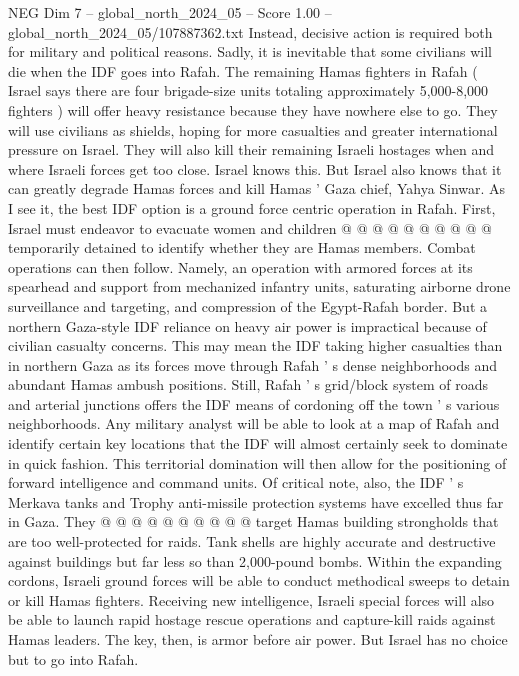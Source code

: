 \begin{textsample}{NEG Dim 7 – global\_north\_2024\_05 – Score 1.00 – global\_north\_2024\_05/107887362.txt}
Instead, decisive action is required both for military and political reasons.
Sadly, it is inevitable that some civilians will die when the IDF goes into Rafah.
The remaining Hamas fighters in Rafah ( Israel says there are four brigade-size units totaling approximately 5,000-8,000 fighters ) will offer heavy resistance because they have nowhere else to go.
They will use civilians as shields, hoping for more casualties and greater international pressure on Israel.
They will also kill their remaining Israeli hostages when and where Israeli forces get too close.
Israel knows this.
But Israel also knows that it can greatly degrade Hamas forces and kill Hamas ' Gaza chief, Yahya Sinwar.
As I see it, the best IDF option is a ground force centric operation in Rafah.
First, Israel must endeavor to evacuate women and children @ @ @ @ @ @ @ @ @ @ temporarily detained to identify whether they are Hamas members.
Combat operations can then follow.
Namely, an operation with armored forces at its spearhead and support from mechanized infantry units, saturating airborne drone surveillance and targeting, and compression of the Egypt-Rafah border.
But a northern Gaza-style IDF reliance on heavy air power is impractical because of civilian casualty concerns.
This may mean the IDF taking higher casualties than in northern Gaza as its forces move through Rafah ' s dense neighborhoods and abundant Hamas ambush positions.
Still, Rafah ' s grid/block system of roads and arterial junctions offers the IDF means of cordoning off the town ' s various neighborhoods.
Any military analyst will be able to look at a map of Rafah and identify certain key locations that the IDF will almost certainly seek to dominate in quick fashion.
This territorial domination will then allow for the positioning of forward intelligence and command units.
Of critical note, also, the IDF ' s Merkava tanks and Trophy anti-missile protection systems have excelled thus far in Gaza.
They @ @ @ @ @ @ @ @ @ @ target Hamas building strongholds that are too well-protected for raids.
Tank shells are highly accurate and destructive against buildings but far less so than 2,000-pound bombs.
Within the expanding cordons, Israeli ground forces will be able to conduct methodical sweeps to detain or kill Hamas fighters.
Receiving new intelligence, Israeli special forces will also be able to launch rapid hostage rescue operations and capture-kill raids against Hamas leaders.
The key, then, is armor before air power.
But Israel has no choice but to go into Rafah.

\end{textsample}
